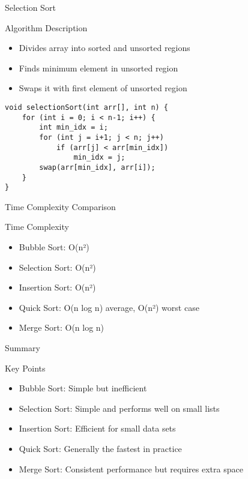 \documentclass{beamer}
\begin{document}
\begin{frame}[fragile]{Selection Sort}
\begin{block}{Algorithm Description}
\begin{itemize}
\item Divides array into sorted and unsorted regions
\item Finds minimum element in unsorted region
\item Swaps it with first element of unsorted region
\end{itemize}
\end{block}

\begin{lstlisting}
void selectionSort(int arr[], int n) {
    for (int i = 0; i < n-1; i++) {
        int min_idx = i;
        for (int j = i+1; j < n; j++)
            if (arr[j] < arr[min_idx])
                min_idx = j;
        swap(arr[min_idx], arr[i]);
    }
}
\end{lstlisting}
\end{frame}


\begin{frame}{Time Complexity Comparison}
\begin{block}{Time Complexity}
\begin{itemize}
\item Bubble Sort: O(n²)
\item Selection Sort: O(n²)
\item Insertion Sort: O(n²)
\item Quick Sort: O(n log n) average, O(n²) worst case
\item Merge Sort: O(n log n)
\end{itemize}
\end{block}
\end{frame}

\begin{frame}{Summary}
\begin{block}{Key Points}
\begin{itemize}
\item Bubble Sort: Simple but inefficient
\item Selection Sort: Simple and performs well on small lists
\item Insertion Sort: Efficient for small data sets
\item Quick Sort: Generally the fastest in practice
\item Merge Sort: Consistent performance but requires extra space
\end{itemize}
\end{block}
\end{frame}
\end{document}
